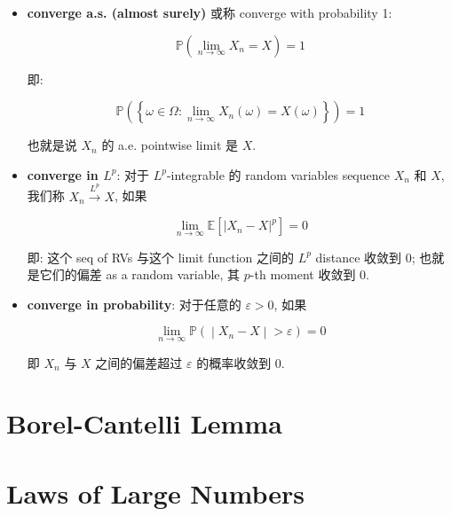 \begin{definition}{}

\begin{itemize}
\item
  \textbf{converge a.s. (almost surely)} 或称 converge with probability 1:

  \[\mathbb{P}\left( {\lim\limits_{\mathit{n}\rightarrow\infty}\mathit{X}_{\mathit{n}} = \mathit{X}} \right) = 1\]

  即:

  \[\mathbb{P}\left( \left\{ {\mathit{\omega} \in \Omega:\lim\limits_{\mathit{n}\rightarrow\infty}\mathit{X}_{\mathit{n}}(\mathit{\omega}) = \mathit{X}(\mathit{\omega})} \right\} \right) = 1\]

  也就是说 \(\mathit{X}_{\mathit{n}}\) 的 a.e. pointwise limit 是 \(\mathit{X}\).
\item
  \textbf{converge in \(\mathit{L}^{\mathit{p}}\)}: 对于 \(\mathit{L}^{\mathit{p}}\)-integrable 的 random variables sequence \(\mathit{X}_{\mathit{n}}\) 和 \(\mathit{X}\), 我们称 \(\mathit{X}_{\mathit{n}}\overset{\mathit{L}^{\mathit{p}}}{\rightarrow}\mathit{X}\), 如果

  \[\lim\limits_{\mathit{n}\rightarrow\infty}\mathbb{E}\left\lbrack \left| {\mathit{X}_{\mathit{n}} - \mathit{X}} \right|^{\mathit{p}} \right\rbrack = 0\]

  即: 这个 seq of RVs 与这个 limit function 之间的 \(\mathit{L}^{\mathit{p}}\) distance 收敛到 0; 也就是它们的偏差 as a random variable, 其 \(\mathit{p}\)-th moment 收敛到 0.
\item
  \textbf{converge in probability}: 对于任意的 \(\mathit{\varepsilon} > 0\), 如果

  \[\left. \lim\limits_{\mathit{n}\rightarrow\infty}\mathbb{P}( \middle| \mathit{X}_{\mathit{n}} - \mathit{X} \middle| > \mathit{\varepsilon}) = 0 \right.\]

  即 \(\mathit{X}_{\mathit{n}}\) 与 \(\mathit{X}\) 之间的偏差超过 \(\mathit{\varepsilon}\) 的概率收敛到 0.
\end{itemize}

\end{definition}

\section{Borel-Cantelli Lemma}\label{borel-cantelli-lemma}

\section{Laws of Large Numbers}\label{laws-of-large-numbers}

